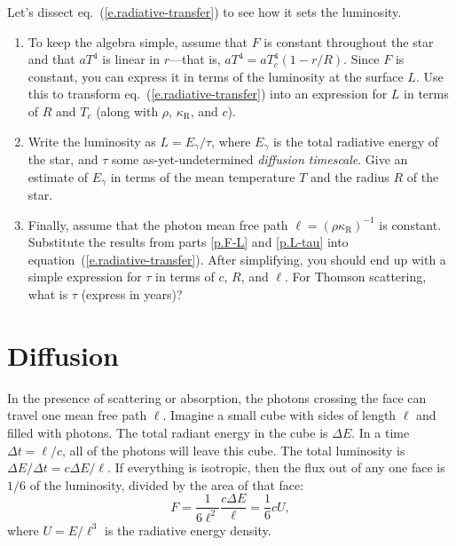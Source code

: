 \begin{exercisebox}
\label{ex.radiative-transfer-diffusion}
Let's dissect eq.~(\ref{e.radiative-transfer}) to see how it sets the luminosity.  
\begin{enumerate}
\item\label{p.F-L}
To keep the algebra simple, assume that $F$ is constant throughout the star and that $aT^{4}$ is linear in $r$---that is, $aT^{4} = aT_{c}^{4}(1-r/R)$.  Since $F$ is constant, you can express it in terms of the luminosity at the surface $L$.  Use this to transform eq.~(\ref{e.radiative-transfer}) into an expression for $L$ in terms of $R$ and $T_{c}$ (along with $\rho$, $\kappa_{\mathrm{R}}$, and $c$).

\item\label{p.L-tau}
Write the luminosity as $L = E_{\gamma}/\tau$, where $E_{\gamma}$ is the total radiative energy of the star, and $\tau$ some as-yet-undetermined \emph{diffusion timescale}.  Give an estimate of $E_{\gamma}$ in terms of the mean temperature $T$ and the radius $R$ of the star.

\item\label{p.tau}
Finally, assume that the photon mean free path $\ell = (\rho\kappa_{\mathrm{R}})^{-1}$ is constant.  Substitute the results from parts \ref{p.F-L} and \ref{p.L-tau} into equation~(\ref{e.radiative-transfer}).  After simplifying, you should end up with a simple expression for $\tau$ in terms of $c$, $R$, and $\ell$.  For Thomson scattering, what is $\tau$ (express in years)?
\end{enumerate}
\end{exercisebox}

\section{Diffusion}\label{s.diffusion}

In the presence of scattering or absorption, the photons crossing the face can travel one mean free path $\ell$. Imagine a small cube with sides of length $\ell$ and filled with photons. The total radiant energy in the cube is $\Delta E$. In a time $\Delta t = \ell/c$, all of the photons will leave this cube. The total luminosity is $\Delta E/\Delta t = c\Delta E/\ell$. If everything is isotropic, then the flux out of any one face is $1/6$ of the luminosity, divided by the area of that face:
\[
	F = \frac{1}{6\ell^{2}}\frac{c\Delta E}{\ell} = \frac{1}{6}c U,
\]
where $U = E/\ell^{3}$ is the radiative energy density. 


